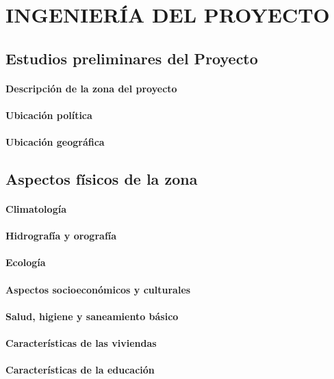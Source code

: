 \chapter{INGENIERÍA DEL PROYECTO}
    \section{Estudios preliminares del Proyecto}
        \subsubsection{Descripción de la zona del proyecto}
        \subsubsection{Ubicación política}
        \subsubsection{Ubicación geográfica}
    \section{Aspectos físicos de la zona}
        \subsubsection{Climatología}
        \subsubsection{Hidrografía y orografía}
        \subsubsection{Ecología}
        \subsubsection{Aspectos socioeconómicos y culturales}
        \subsubsection{Salud, higiene y saneamiento básico}
        \subsubsection{Características de las viviendas}
        \subsubsection{Características de la educación}
